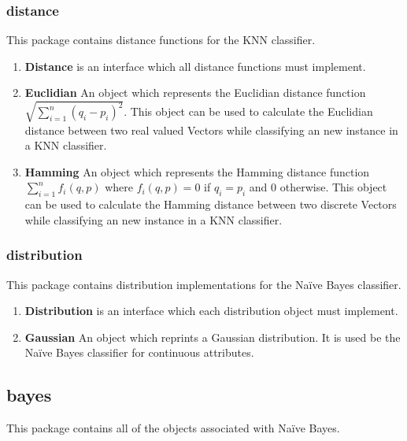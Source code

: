 \documentclass[11pt]{article}
\newcommand{\bb}{\textbf}
\begin{document}
\subsubsection{distance}
This package contains distance functions for the KNN classifier.

\begin{enumerate}[leftmargin=*]
  \item[] \bb{Distance} is an interface which all distance functions must implement.
  \item[] \bb{Euclidian} An object which represents the Euclidian distance function $\sqrt{\sum_{i=1}^{n}(q_i-p_i)^2}$. This object can be used to calculate the Euclidian distance between two real valued Vectors while classifying an new instance in a KNN classifier.
  \item[] \bb{Hamming} An object which represents the Hamming distance function $\sum_{i=1}^{n}f_i(q, p)$ where $f_i(q, p) = 0$ if $q_i = p_i$ and $0$ otherwise. This object can be used to calculate the Hamming distance between two discrete Vectors while classifying an new instance in a KNN classifier.
\end{enumerate}

\subsubsection{distribution}
This package contains distribution implementations for the Naïve Bayes classifier.

\begin{enumerate}[leftmargin=*]
  \item[] \bb{Distribution} is an interface which each distribution object must implement.
  \item[] \bb{Gaussian} An object which reprints a Gaussian distribution. It is used be the Naïve Bayes classifier for continuous attributes.
\end{enumerate}

\subsection{bayes}
This package contains all of the objects associated with Naïve Bayes.
\end{document}

